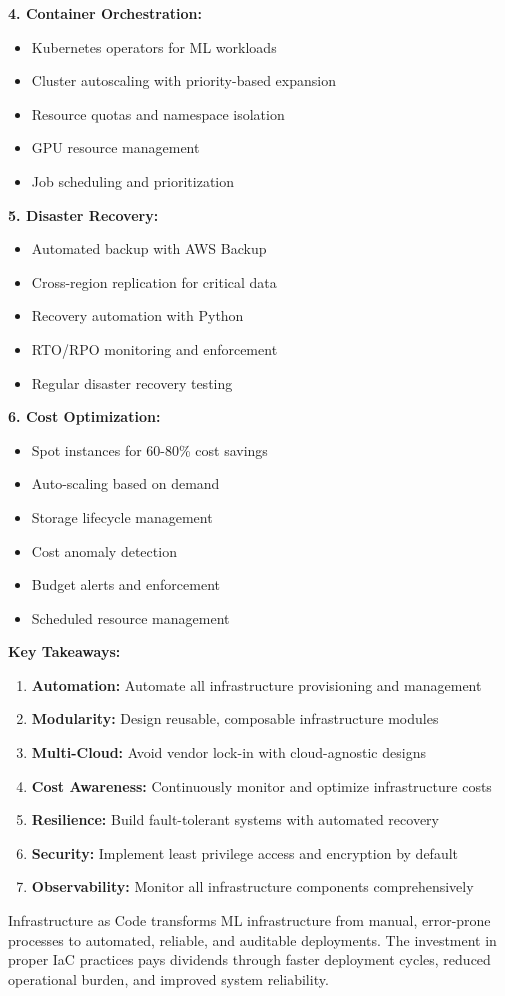 \textbf{4. Container Orchestration:}
\begin{itemize}
    \item Kubernetes operators for ML workloads
    \item Cluster autoscaling with priority-based expansion
    \item Resource quotas and namespace isolation
    \item GPU resource management
    \item Job scheduling and prioritization
\end{itemize}

\textbf{5. Disaster Recovery:}
\begin{itemize}
    \item Automated backup with AWS Backup
    \item Cross-region replication for critical data
    \item Recovery automation with Python
    \item RTO/RPO monitoring and enforcement
    \item Regular disaster recovery testing
\end{itemize}

\textbf{6. Cost Optimization:}
\begin{itemize}
    \item Spot instances for 60-80\% cost savings
    \item Auto-scaling based on demand
    \item Storage lifecycle management
    \item Cost anomaly detection
    \item Budget alerts and enforcement
    \item Scheduled resource management
\end{itemize}

\textbf{Key Takeaways:}

\begin{enumerate}
    \item \textbf{Automation:} Automate all infrastructure provisioning and management
    \item \textbf{Modularity:} Design reusable, composable infrastructure modules
    \item \textbf{Multi-Cloud:} Avoid vendor lock-in with cloud-agnostic designs
    \item \textbf{Cost Awareness:} Continuously monitor and optimize infrastructure costs
    \item \textbf{Resilience:} Build fault-tolerant systems with automated recovery
    \item \textbf{Security:} Implement least privilege access and encryption by default
    \item \textbf{Observability:} Monitor all infrastructure components comprehensively
\end{enumerate}

Infrastructure as Code transforms ML infrastructure from manual, error-prone processes to automated, reliable, and auditable deployments. The investment in proper IaC practices pays dividends through faster deployment cycles, reduced operational burden, and improved system reliability.
